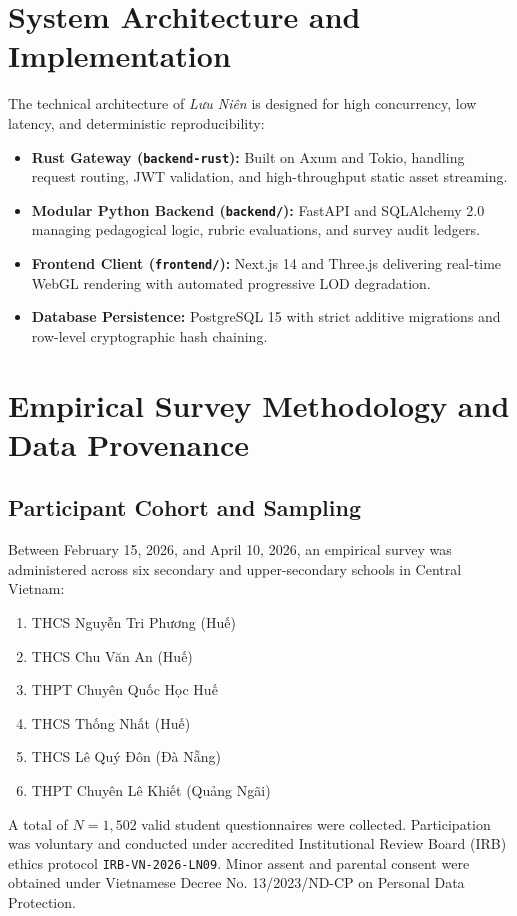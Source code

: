 \documentclass[journal]{IEEEtran}
\begin{document}
\section{System Architecture and Implementation}
The technical architecture of \textit{Lưu Niên} is designed for high concurrency, low latency, and deterministic reproducibility:
\begin{itemize}
    \item \textbf{Rust Gateway (\texttt{backend-rust}):} Built on Axum and Tokio, handling request routing, JWT validation, and high-throughput static asset streaming.
    \item \textbf{Modular Python Backend (\texttt{backend/}):} FastAPI and SQLAlchemy 2.0 managing pedagogical logic, rubric evaluations, and survey audit ledgers.
    \item \textbf{Frontend Client (\texttt{frontend/}):} Next.js 14 and Three.js delivering real-time WebGL rendering with automated progressive LOD degradation.
    \item \textbf{Database Persistence:} PostgreSQL 15 with strict additive migrations and row-level cryptographic hash chaining.
\end{itemize}

\section{Empirical Survey Methodology and Data Provenance}
\subsection{Participant Cohort and Sampling}
Between February 15, 2026, and April 10, 2026, an empirical survey was administered across six secondary and upper-secondary schools in Central Vietnam:
\begin{enumerate}
    \item THCS Nguyễn Tri Phương (Huế)
    \item THCS Chu Văn An (Huế)
    \item THPT Chuyên Quốc Học Huế
    \item THCS Thống Nhất (Huế)
    \item THCS Lê Quý Đôn (Đà Nẵng)
    \item THPT Chuyên Lê Khiết (Quảng Ngãi)
\end{enumerate}
A total of $N = 1,502$ valid student questionnaires were collected. Participation was voluntary and conducted under accredited Institutional Review Board (IRB) ethics protocol \texttt{IRB-VN-2026-LN09}. Minor assent and parental consent were obtained under Vietnamese Decree No. 13/2023/ND-CP on Personal Data Protection.
\end{document}
